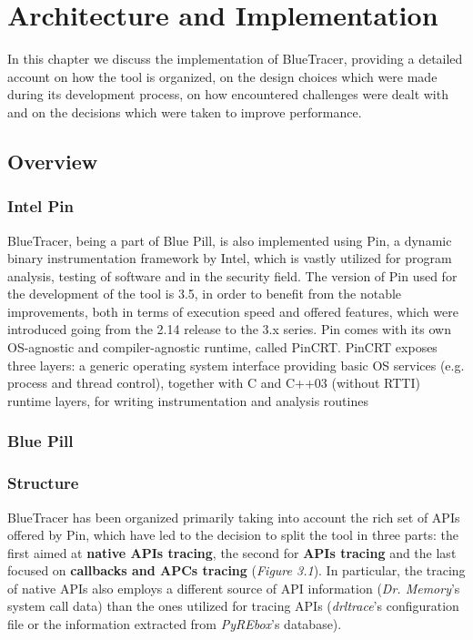 
\chapter{Architecture and Implementation}
In this chapter we discuss the implementation of BlueTracer, providing a detailed account on how the tool is organized, on the design choices which were made during its development process, on how encountered challenges were dealt with and on the decisions which were taken to improve performance.

\section{Overview}

\subsection{Intel Pin}
BlueTracer, being a part of Blue Pill, is also implemented using Pin, a dynamic binary instrumentation framework by Intel, which is vastly utilized for program analysis, testing of software and in the security field. The version of Pin used for the development of the tool is 3.5, in order to benefit from the notable improvements, both in terms of execution speed and offered features, which were introduced going from the 2.14 release to the 3.x series. Pin comes with its own OS-agnostic and compiler-agnostic runtime, called PinCRT. PinCRT exposes three layers: a generic operating system interface providing basic OS services (e.g. process and thread control), together with C and C++03 (without RTTI) runtime layers, for writing instrumentation and analysis routines \cite{Pin}

\subsection{Blue Pill}
\subsection{Structure}
   

BlueTracer has been organized primarily taking into account the rich set of APIs offered by Pin, which have led to the decision to split the tool in three parts: the first aimed at \textbf{native APIs tracing}, the second for \textbf{APIs tracing} and the last focused on \textbf{callbacks and APCs tracing} (\textit{Figure 3.1}). In particular, the tracing of native APIs also employs a different source of API information (\textit{Dr. Memory}'s system call data) than the ones utilized for tracing APIs (\textit{drltrace}'s configuration file or the information extracted from \textit{PyREbox}'s database).

